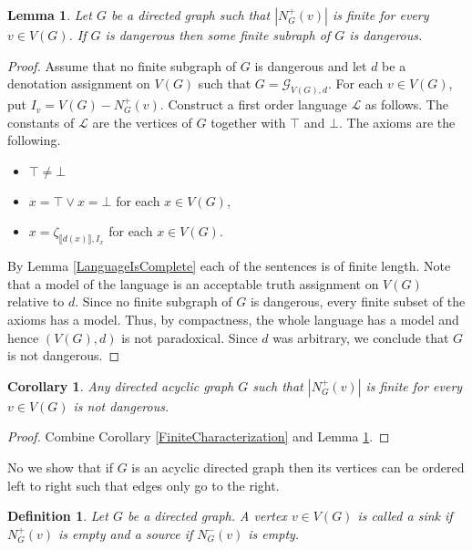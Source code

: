 \documentclass[12pt]{article}
\newtheorem{lem}[thm]{Lemma}
\newtheorem{cor}[thm]{Corollary}
\newtheorem{defn}{Definition}
\theoremstyle{remark}
\newcommand{\fancy}[1]{\mathcal{#1}}
\def\L{\fancy{L}}
\def\G{\fancy{G}}
\begin{document}
\begin{lem}\label{LocalFinite}
Let $G$ be a directed graph such that $|N^{+}_G(v)|$ is finite for every $v \in V(G)$.  If $G$ is dangerous then some finite subraph of $G$ is dangerous.
\end{lem}
\begin{proof}
Assume that no finite subgraph of $G$ is dangerous and let $d$ be a denotation assignment on $V(G)$ such that $G = \G_{V(G), d}$.  For each $v \in V(G)$, put $I_v = V(G) - N^+_G(v)$. Construct a first order language $\fancy{L}$ as follows.  The constants of $\L$ are the vertices of $G$ together with $\top$ and $\bot$.  The axioms are the following.

\begin{itemize}
\item $\top \neq \bot$
\item $x = \top \vee x = \bot$ for each $x \in V(G)$,
\item $x = \zeta_{\llbracket d(x) \rrbracket, I_x}$ for each $x \in V(G)$.
\end{itemize}

By Lemma \ref{LanguageIsComplete} each of the sentences is of finite length.  Note that a model of the language is an acceptable truth assignment on $V(G)$ relative to $d$.  Since no finite subgraph of $G$ is dangerous, every finite subset of the axioms has a model.  Thus, by compactness, the whole language has a model and hence $(V(G), d)$ is not paradoxical.  Since $d$ was arbitrary, we conclude that $G$ is not dangerous.
\end{proof}

\begin{cor}\label{AtLeastOneInfinite}
Any directed acyclic graph $G$ such that $|N^{+}_G(v)|$ is finite for every $v \in V(G)$ is not dangerous.
\end{cor}
\begin{proof}
Combine Corollary \ref{FiniteCharacterization} and Lemma \ref{LocalFinite}.
\end{proof}


No we show that if $G$ is an acyclic directed graph then its vertices can be ordered left to right such that edges only go to the right.  

\begin{defn}
Let $G$ be a directed graph.  A vertex $v \in V(G)$ is called a \emph{sink} if $N^+_G(v)$ is empty and a \emph{source} if $N^-_G(v)$ is empty.
\end{defn}
\end{document}

